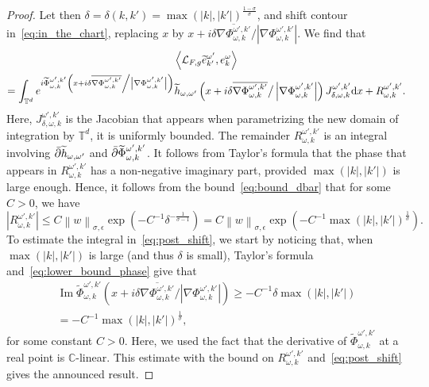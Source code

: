 \documentclass[AHL,Unicode,longabstracts,published]{cedram}
\DeclareMathOperator{\im}{Im}
\newcommand{\p}[1]{\left(#1\right)}
\newcommand{\n}[1]{\left\|#1\right\|}
\newcommand{\va}[1]{\left|#1\right|}
\newcommand{\clL}{\mathcal{L}}
\newcommand{\bbC}{\mathbb{C}}
\newcommand{\bbT}{\mathbb{T}}
\newcommand{\rmd}{\mathrm{d}}
\let\oldtilde\tilde
\renewcommand*{\tilde}[1]{\mathchoice{\widetilde{#1}}{\widetilde{#1}}{\oldtilde{#1}}{\oldtilde{#1}}}
\begin{document}
\begin{proof}
Let then $\delta = \delta(k,k') = \max(|k|,|k'|)^{\frac{1 - \sigma}{\sigma}}$, and shift contour in~\eqref{eq:in_the_chart}, replacing $x$ by $x + i \delta \overline{\nabla \Phi_{\omega,k}^{\omega',k'}}/ \va{\nabla \Phi_{\omega,k}^{\omega',k'}}$. We find that
\begin{multline}\label{eq:post_shift}
\left\langle \clL_{F,g} \tilde{e}_{k'}^{\omega'}, e_k^\omega \right\rangle \\ = \int_{\bbT^d} e^{i \widetilde{\Phi}_{\omega,k}^{\omega',k'} \left(x+ i\delta \overline{\nabla \Phi_{\omega,k}^{\omega',k'}} \middle/ \va{\nabla \Phi_{\omega,k}^{\omega',k'}}\right)} \tilde{h}_{\omega,\omega'}\left(x + i\delta \overline{\nabla \Phi_{\omega,k}^{\omega',k'}} \big/ \va{\nabla \Phi_{\omega,k}^{\omega',k'}}\right) J_{\delta,\omega,k}^{\omega',k'} \rmd x + R_{\omega,k}^{\omega',k'}.
\end{multline}
Here, $J_{\delta,\omega,k}^{\omega',k'}$ is the Jacobian that appears when parametrizing the new domain of integration by $\bbT^d$, it is uniformly bounded. The remainder $R_{\omega,k}^{\omega',k'}$ is an integral involving $\bar{\partial} \tilde{h}_{\omega,\omega'}$ and $\bar{\partial} \tilde{\Phi}_{\omega,k}^{\omega',k'}$. It follows from Taylor's formula that the phase that appears in $R_{\omega,k}^{\omega',k'}$ has a non-negative imaginary part, provided $\max(|k|,|k'|)$ is large enough. Hence, it follows from the bound~\eqref{eq:bound_dbar} that for some $C > 0$, we have
\begin{equation*}
\va{R_{\omega,k}^{\omega',k'}} \leq C \n{w}_ {\sigma,\epsilon} \exp\p{ - C^{-1} \delta^{- \frac{1}{\sigma - 1}}} = C \n{w}_{\sigma,\epsilon} \exp\p{ - C^{-1} \max(|k|,|k'|)^{\frac{1}{\sigma}}}.
\end{equation*}
To estimate the integral in~\eqref{eq:post_shift}, we start by noticing that, when $\max(|k|,|k'|)$ is large (and thus $\delta$ is small), Taylor's formula and~\eqref{eq:lower_bound_phase} give that
\begin{multline*}
\im \widetilde{\Phi}_{\omega,k}^{\omega',k'} \left(x+ i\delta \overline{\nabla \Phi_{\omega,k}^{\omega',k'}} \big/ \va{\nabla \Phi_{\omega,k}^{\omega',k'}}\right) \geq - C^{-1} \delta \max(|k|,|k'|) \\ = -C^{-1} \max(|k|,|k'|)^{\frac{1}{\sigma}},
\end{multline*}
for some constant $C > 0$. Here, we used the fact that the derivative of $\widetilde{\Phi}_{\omega,k}^{\omega',k'}$ at a real point is $\bbC$-linear. This estimate with the bound on $R_{\omega,k}^{\omega',k'}$ and~\eqref{eq:post_shift} gives the announced result.
\end{proof}
\end{document}
